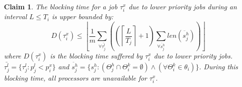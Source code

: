 \documentclass[twocolumn]{article}
\newtheorem{clm}{Claim}
\begin{document}
\begin{clm}\label{delay}
The blocking time for a job $\tau_{i}^{x}$ due to lower priority jobs 
during an interval $L\le T_{i}$ is upper bounded by:
\begin{equation}
D(\tau_{i}^{x})\le\left\lfloor \frac{1}{m}\sum_{\forall\bar{\tau_{j}^{l}}}\left(\left(\left\lceil \frac{L}{T_{j}}\right\rceil +1\right)\sum_{\forall\ddot{s_{j}^{h}}}len\left(\ddot{s_{j}^{h}}\right)\right)\right\rfloor \label{PNF-delay}
\end{equation}
where $D(\tau_{i}^{x})$ is the blocking time 
suffered by $\tau_{i}^{x}$
due to lower priority jobs. $\bar{\tau_{j}^{l}}=\{\tau_{j}^{l}:p_{j}^{l}<p_{i}^{x}\}$
and $\ddot{s_{j}^{h}}=\{s_{j}^{h}:\left(\Theta_{j}^{h} \cap \Theta_i^k = \emptyset \right) \wedge \left(\forall \Theta_i^k \in \theta_i \right)\}$. During this blocking time, all processors are unavailable for $\tau_{i}^{x}$.
\end{clm}
\end{document}
